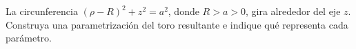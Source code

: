 La circunferencia $(\rho-R)^2+z^2=a^2$, donde $R>a>0$, gira alrededor del eje $z$. Construya una parametrización del toro resultante e indique qué representa cada parámetro.
